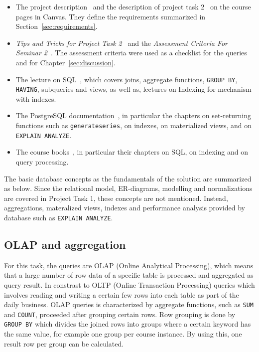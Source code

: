 \documentclass[a4paper]{scrartcl}
\renewcommand{\_}{\textunderscore\allowbreak}
\begin{document}
\begin{itemize}
  \item The project description~\cite{project} and the description of project task 2~\cite{task2} on the course pages in Canvas. They define the requirements summarized in Section~\ref{sec:requirements}.
  \item \textit{Tips and Tricks for Project Task 2}~\cite{tips2} and the \textit{Assessment Criteria For Seminar 2}~\cite{criteria2}. The assessment criteria were used as a checklist for the queries and for Chapter~\ref{sec:discussion}.
  \item The lecture on SQL~\cite{sqllecture}, which covers joins, aggregate functions, \texttt{GROUP BY}, \texttt{HAVING}, subqueries and views, as well as, lectures on Indexing for mechanism with indexes.
  \item The PostgreSQL documentation~\cite{postgresdocs}, in particular the chapters on set-returning functions such as \texttt{generate\_series}, on indexes, on materialized views, and on \texttt{EXPLAIN ANALYZE}.
  \item The course books~\cite{elmasri,silberschatz}, in particular their chapters on SQL, on indexing and on query processing.
\end{itemize}

The basic database concepts as the fundamentals of the solution are summarized as below. Since the relational model, ER-diagrams, modelling and normalizations are covered in Project Task 1, these concepts are not mentioned. Instead, aggregations, materalized views, indexes and performance analysis provided by database such as \texttt{EXPLAIN ANALYZE}. 

\subsection{OLAP and aggregation}

For this task, the queries are OLAP (Online Analytical Processing), which means that a large number of row data of a specific table is processed and aggregated as query result. In constrast to OLTP (Online Transaction Processing) queries which involves reading and writing a certain few rows into each table as part of the daily business. OLAP queries is characterized by aggregate functions, such as \texttt{SUM} and \texttt{COUNT}, proceeded after grouping certain rows. Row grouping is done by \texttt{GROUP BY} which divides the joined rows into groups where a certain keyword has the same value, for example one group per course instance. By using this, one result row per group can be calculated.
\end{document}
